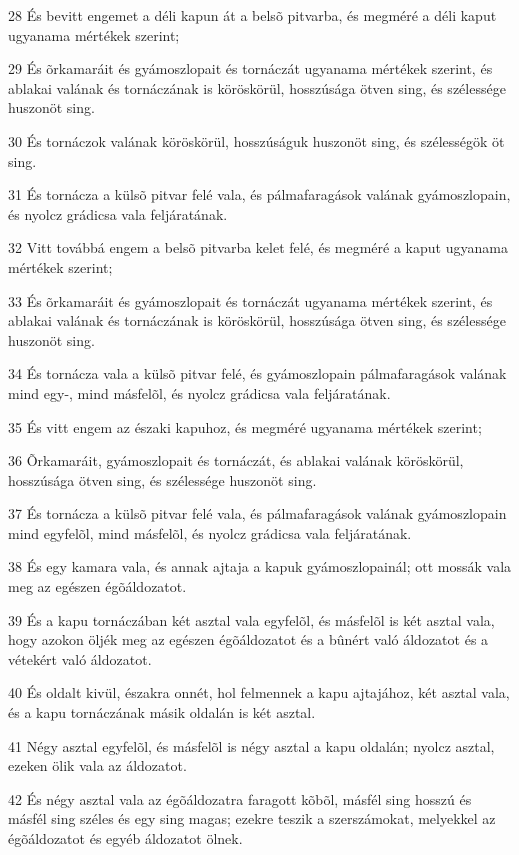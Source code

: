\par 28 És bevitt engemet a déli kapun át a belsõ pitvarba, és megméré a déli kaput ugyanama mértékek szerint;
\par 29 És õrkamaráit és gyámoszlopait és tornáczát ugyanama mértékek szerint, és ablakai valának és tornáczának is köröskörül, hosszúsága ötven sing, és szélessége huszonöt sing.
\par 30 És tornáczok valának köröskörül, hosszúságuk huszonöt sing, és szélességök öt sing.
\par 31 És tornácza a külsõ pitvar felé vala, és pálmafaragások valának gyámoszlopain, és nyolcz grádicsa vala feljáratának.
\par 32 Vitt továbbá engem a belsõ pitvarba kelet felé, és megméré a kaput ugyanama mértékek szerint;
\par 33 És õrkamaráit és gyámoszlopait és tornáczát ugyanama mértékek szerint, és ablakai valának és tornáczának is köröskörül, hosszúsága ötven sing, és szélessége huszonöt sing.
\par 34 És tornácza vala a külsõ pitvar felé, és gyámoszlopain pálmafaragások valának mind egy-, mind másfelõl, és nyolcz grádicsa vala feljáratának.
\par 35 És vitt engem az északi kapuhoz, és megméré ugyanama mértékek szerint;
\par 36 Õrkamaráit, gyámoszlopait és tornáczát, és ablakai valának köröskörül, hosszúsága ötven sing, és szélessége huszonöt sing.
\par 37 És tornácza a külsõ pitvar felé vala, és pálmafaragások valának gyámoszlopain mind egyfelõl, mind másfelõl, és nyolcz grádicsa vala feljáratának.
\par 38 És egy kamara vala, és annak ajtaja a kapuk gyámoszlopainál; ott mossák vala meg az egészen égõáldozatot.
\par 39 És a kapu tornáczában két asztal vala egyfelõl, és másfelõl is két asztal vala, hogy azokon öljék meg az egészen égõáldozatot és a bûnért való áldozatot és a vétekért való áldozatot.
\par 40 És oldalt kivül, északra onnét, hol felmennek a kapu ajtajához, két asztal vala, és a kapu tornáczának másik oldalán is két asztal.
\par 41 Négy asztal egyfelõl, és másfelõl is négy asztal a kapu oldalán; nyolcz asztal, ezeken ölik vala az áldozatot.
\par 42 És négy asztal vala az égõáldozatra faragott kõbõl, másfél sing hosszú és másfél sing széles és egy sing magas; ezekre teszik a szerszámokat, melyekkel az égõáldozatot és egyéb áldozatot ölnek.
